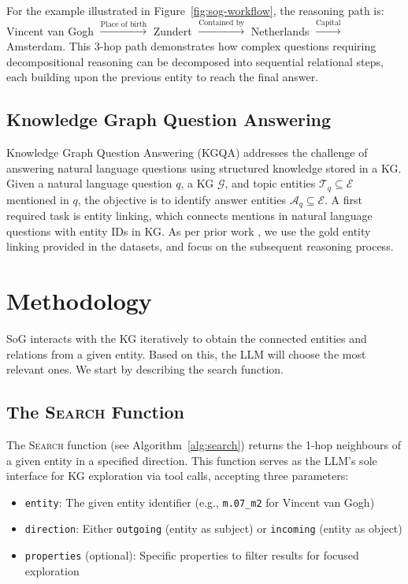 \documentclass[sigconf]{acmart}
\begin{document}
For the example illustrated in Figure~\ref{fig:sog-workflow}, the reasoning path is: Vincent van Gogh $\xrightarrow{\text{Place of birth}}$ Zundert $\xrightarrow{\text{Contained by}}$ Netherlands $\xrightarrow{\text{Capital}}$ Amsterdam. This 3-hop path demonstrates how complex questions requiring decompositional reasoning can be decomposed into sequential relational steps, each building upon the previous entity to reach the final answer.

\subsection{Knowledge Graph Question Answering}

Knowledge Graph Question Answering (KGQA) addresses the challenge of answering natural language questions using structured knowledge stored in a KG. Given a natural language question $q$, a KG $\mathcal{G}$, and topic entities $\mathcal{T}_q \subseteq \mathcal{E}$ mentioned in $q$, the objective is to identify answer entities $\mathcal{A}_q \subseteq \mathcal{E}$. A first required task is entity linking, which connects mentions in natural language questions with entity IDs in KG. As per prior work \citep{luo2024reasoning, sun2024thinkongraph, chen2024plan}, we use the gold entity linking provided in the datasets, and focus on the subsequent reasoning process.

\section{Methodology}
\label{sec:methodology}
SoG interacts with the KG iteratively to obtain the connected entities and relations from a given entity. Based on this, the LLM will choose the most relevant ones. We start by describing the search function.

\subsection{The \textsc{Search} Function}
\label{sec:search_function}

The \textsc{Search} function (see Algorithm~\ref{alg:search}) returns the 1-hop neighbours of a given entity in a specified direction. This function serves as the LLM's sole interface for KG exploration via tool calls, accepting three parameters:

\begin{itemize}
    \item \texttt{entity}: The given entity identifier (e.g., \texttt{m.07\_m2} for Vincent van Gogh)
    \item \texttt{direction}: Either \texttt{outgoing} (entity as subject) or \texttt{incoming} (entity as object)  
    \item \texttt{properties} (optional): Specific properties to filter results for focused exploration
\end{itemize}
\end{document}
